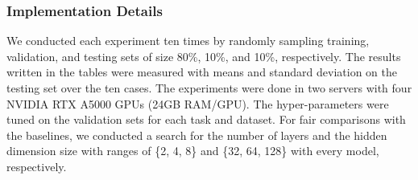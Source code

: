 \documentclass[oneside]{article}
\begin{document}
\subsubsection{Implementation Details}
We conducted each experiment ten times by randomly sampling  training, validation, and testing sets of size 80\%, 10\%, and 10\%, respectively.
The results written in the tables were measured with means and standard deviation on the testing set over the ten cases.
The experiments were done in two servers with four NVIDIA RTX A5000 GPUs (24GB RAM/GPU).
The hyper-parameters were tuned on the validation sets for each task and dataset.
For fair comparisons with the baselines, we conducted a search for the number of layers and the hidden dimension size with ranges of \{2, 4, 8\} and \{32, 64, 128\} with every model, respectively. 
\end{document}
